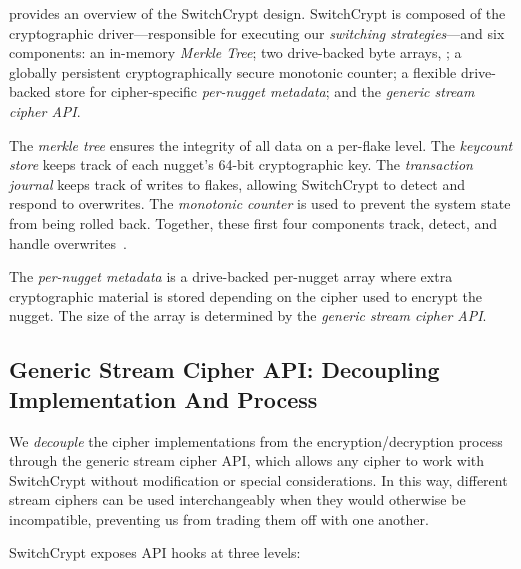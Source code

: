  provides an overview of the SwitchCrypt design. SwitchCrypt is
composed of the cryptographic driver---responsible for executing our
\emph{switching strategies}---and six components: an in-memory \emph{Merkle
Tree}; two drive-backed byte arrays, ; a globally persistent cryptographically secure
monotonic counter; a flexible drive-backed store for cipher-specific
\emph{per-nugget metadata}; and the \emph{generic stream cipher API}.

The \emph{merkle tree} ensures the integrity of all data on a per-flake level.
The \emph{keycount store} keeps track of each nugget's 64-bit cryptographic key.
The \emph{transaction journal} keeps track of writes to flakes, allowing
SwitchCrypt to detect and respond to overwrites. The \emph{monotonic counter} is
used to prevent the system state from being rolled back. Together, these first
four components track, detect, and handle overwrites~\cite{StrongBox}.

The \emph{per-nugget metadata} is a drive-backed per-nugget array where extra
cryptographic material is stored depending on the cipher used to encrypt the
nugget. The size of the array is determined by the \emph{generic stream cipher
API}. 

\subsection{Generic Stream Cipher API: Decoupling Implementation And Process} \label{subsec:api}

We \emph{decouple} the cipher implementations from the encryption/decryption
process through the generic stream cipher API, which allows any cipher to work
with SwitchCrypt without modification or special considerations. In this way,
different stream ciphers can be used interchangeably when they would otherwise
be incompatible, preventing us from trading them off with one another.

SwitchCrypt exposes API hooks at three levels:


